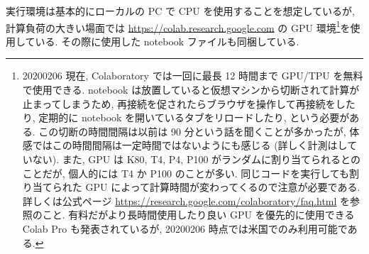 実行環境は基本的にローカルの PC で CPU を使用することを想定しているが, 計算負荷の大きい場面では \href{https://colab.research.google.com}{https://colab.research.google.com} の GPU 環境\footnote{
20200206 現在, Colaboratory では一回に最長 12 時間まで GPU/TPU を無料で使用できる.
notebook は放置していると仮想マシンから切断されて計算が止まってしまうため, 再接続を促されたらブラウザを操作して再接続をしたり, 定期的に notebook を開いているタブをリロードしたり, という必要がある.
この切断の時間間隔は以前は 90 分という話を聞くことが多かったが, 体感ではこの時間間隔は一定時間ではないようにも感じる (詳しく計測はしていない).
また, GPU は K80, T4, P4, P100 がランダムに割り当てられるとのことだが, 個人的には T4 か P100 のことが多い.
同じコードを実行しても割り当てられた GPU によって計算時間が変わってくるので注意が必要である.
詳しくは公式ページ \href{https://research.google.com/colaboratory/faq.html}{https://research.google.com/colaboratory/faq.html} を参照のこと.
有料だがより長時間使用したり良い GPU を優先的に使用できる Colab Pro も発表されているが, 20200206 時点では米国でのみ利用可能である.
}を使用している.
その際に使用した notebook ファイルも同梱している.